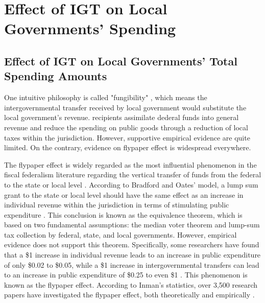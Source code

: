 \section{Effect of IGT on Local Governments' Spending}

\subsection{Effect of IGT on Local Governments' Total Spending Amounts}

One intuitive philosophy is called "fungibility" \cite{pack1993foreign}, which means the intergovernmental transfer received by local government would substitute the local government's revenue. recipients assimilate dederal funds into general revenue and reduce the spending on public goods through a reduction of local taxes within the jurisdiction. However, supportive empirical evidence are quite limited. On the contrary, evidence on flypaper effect is widespread everywhere.

The flypaper effect is widely regarded as the most influential phenomenon in the fiscal federalism literature regarding the vertical transfer of funds from the federal to the state or local level \cite{hines1995anomalies,gamkhar2007impact}. According to Bradford and Oates' model, a lump sum grant to the state or local level should have the same effect as an increase in individual revenue within the jurisdiction in terms of stimulating public expenditure \cite{bradford1971analysis}. This conclusion is known as the equivalence theorem, which is based on two fundamental assumptions: the median voter theorem and lump-sum tax collection by federal, state, and local governments. However, empirical evidence does not support this theorem. Specifically, some researchers have found that a \$1 increase in individual revenue leads to an increase in public expenditure of only \$0.02 to \$0.05, while a \$1 increase in intergovernmental transfers can lead to an increase in public expenditure of \$0.25 to even \$1 \cite{bailey1998flypaper,dollery1996empirical,gamkhar2007impact}. This phenomenon is known as the flypaper effect. According to Inman's statistics, over 3,500 research papers have investigated the flypaper effect, both theoretically and empirically \cite{inman2008flypaper}.

